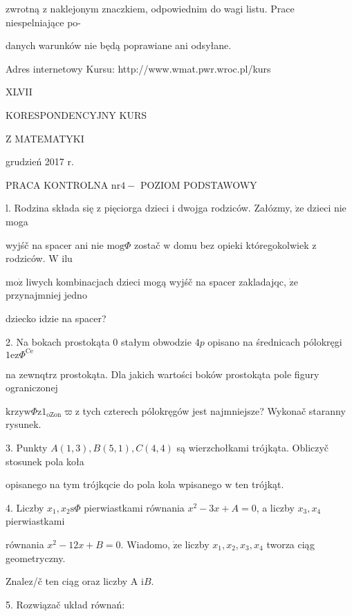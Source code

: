 \documentclass[a4paper,12pt]{article}
\begin{document}
zwrotną $\mathrm{z}$ naklejonym znaczkiem, odpowiednim do wagi listu. Prace niespelniające po-

danych warunków nie będą poprawiane ani odsyłane.

Adres internetowy Kursu: http://www.wmat.pwr.wroc.pl/kurs







XLVII

KORESPONDENCYJNY KURS

Z MATEMATYKI

grudzień 2017 r.

PRACA KONTROLNA $\mathrm{n}\mathrm{r} 4-$ POZIOM PODSTAWOWY

l. Rodzina składa się $\mathrm{z}$ pięciorga dzieci $\mathrm{i}$ dwojga rodziców. Załózmy, $\dot{\mathrm{z}}\mathrm{e}$ dzieci nie moga

wyjśč na spacer ani nie $\mathrm{m}\mathrm{o}\mathrm{g}\Phi$ zostač $\mathrm{w}$ domu bez opieki któregokolwiek $\mathrm{z}$ rodziców. $\mathrm{W}$ ilu

$\mathrm{m}\mathrm{o}\dot{\mathrm{z}}$ liwych kombinacjach dzieci mogą wyjśč na spacer zakladajqc, $\dot{\mathrm{z}}\mathrm{e}$ przynajmniej jedno

dziecko idzie na spacer?

2. Na bokach prostokąta $0$ stałym obwodzie $4p$ opisano na średnicach pólokręgi $1\mathrm{e}\mathrm{z}\Phi^{\mathrm{C}\mathrm{e}}$

na zewnqtrz prostokąta. Dla jakich wartości boków prostokąta pole figury ograniczonej

$\mathrm{k}\mathrm{r}\mathrm{z}\mathrm{y}\mathrm{w}\Phi \mathrm{z}1_{\mathrm{o}\mathrm{Z}\mathrm{o}\mathrm{n}}\varpi \mathrm{z}$ tych czterech pólokręgów jest najmniejsze? Wykonač staranny rysunek.

3. Punkty $A(1,3), B(5,1), C(4,4)$ są wierzchołkami trójkąta. Obliczyč stosunek pola koła

opisanego na tym trójkqcie do pola kola wpisanego $\mathrm{w}$ ten trójkąt.

4. Liczby $x_{1},  x_{2}\mathrm{s}\Phi$ pierwiastkami równania $x^{2}-3x+A=0$, a liczby $x_{3}, x_{4}$ pierwiastkami

równania $x^{2}-12x+B=0$. Wiadomo, $\dot{\mathrm{z}}\mathrm{e}$ liczby $x_{1}, x_{2}, x_{3}, x_{4}$ tworza ciąg geometryczny.

Znalez/č ten ciąg oraz liczby A $\mathrm{i}B.$

5. Rozwiązač układ równań:
\end{document}
